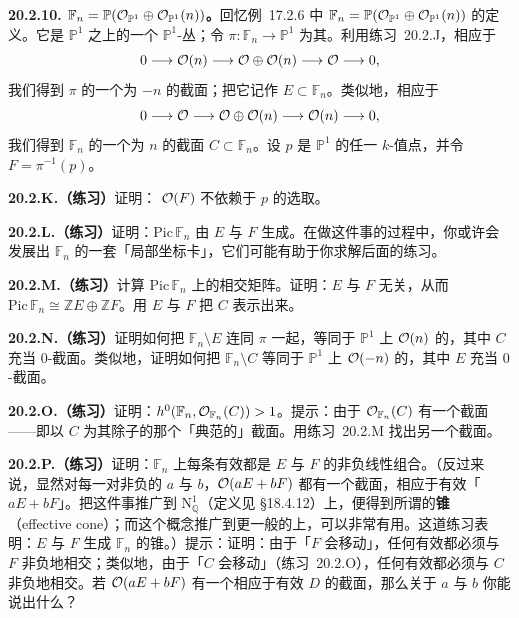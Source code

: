 \textbf{20.2.10. \trHirzebruchSurface{} $\mathbb{F}_n=\mathbb{P}(\mathcal{O}_{\mathbb{P}^1}\oplus\mathcal{O}_{\mathbb{P}^1}(n))$。}\quad 回忆\mbox{例~17.2.6} 中\trHirzebruchSurface{} $\mathbb{F}_n=\mathbb{P}(\mathcal{O}_{\mathbb{P}^1}\oplus\mathcal{O}_{\mathbb{P}^1}(n))$ 的定义。它是 $\mathbb{P}^1$ 之上的一个 $\mathbb{P}^1$-丛；令 $\pi\colon\mathbb{F}_n\to\mathbb{P}^1$ 为其\trStructureMorphism。利用\mbox{练习~20.2.J}，相应于
\[
0\longrightarrow\mathcal{O}(n)\longrightarrow\mathcal{O}\oplus\mathcal{O}(n)\longrightarrow\mathcal{O}\longrightarrow 0,
\]
我们得到 $\pi$ 的一个\trSelfIntersection{}为 $-n$ 的截面；把它记作 $E\subset\mathbb{F}_n$。类似地，相应于
\[
0\longrightarrow\mathcal{O}\longrightarrow\mathcal{O}\oplus\mathcal{O}(n)\longrightarrow\mathcal{O}(n)\longrightarrow 0,
\]
我们得到 $\mathbb{F}_n$ 的一个\trSelfIntersection{}为 $n$ 的截面 $C\subset\mathbb{F}_n$。设 $p$ 是 $\mathbb{P}^1$ 的任一 $k$-值点，并令 $F=\pi^{-1}(p)$。

\textbf{20.2.K.（练习）}\quad 证明：\trLineBundle{} $\mathcal{O}(F)$ 不依赖于 $p$ 的选取。

\textbf{20.2.L.（练习）}\quad 证明：$\mathrm{Pic}\,\mathbb{F}_n$ 由 $E$ 与 $F$ 生成。在做这件事的过程中，你或许会发展出 $\mathbb{F}_n$ 的一套「局部坐标卡」，它们可能有助于你求解后面的练习。

\textbf{20.2.M.（练习）}\quad 计算 $\mathrm{Pic}\,\mathbb{F}_n$ 上的相交矩阵。证明：$E$ 与 $F$ 无关，从而 $\mathrm{Pic}\,\mathbb{F}_n\cong\mathbb{Z}E\oplus\mathbb{Z}F$。用 $E$ 与 $F$ 把 $C$ 表示出来。

\textbf{20.2.N.（练习）}\quad 证明如何把 $\mathbb{F}_n\setminus E$ 连同\trStructureMorphism{} $\pi$ 一起，等同于 $\mathbb{P}^1$ 上\trLineBundle{} $\mathcal{O}(n)$ 的\trTotalSpace，其中 $C$ 充当 $0$-截面。类似地，证明如何把 $\mathbb{F}_n\setminus C$ 等同于 $\mathbb{P}^1$ 上\trLineBundle{} $\mathcal{O}(-n)$ 的\trTotalSpace，其中 $E$ 充当 $0$-截面。

\textbf{20.2.O.（练习）}\quad 证明：$h^0(\mathbb{F}_n,\mathcal{O}_{\mathbb{F}_n}(C))>1$。提示：由于 $\mathcal{O}_{\mathbb{F}_n}(C)$ 有一个截面——即以 $C$ 为其除子的那个「典范的」截面。用\mbox{练习~20.2.M} 找出另一个截面。

\textbf{20.2.P.（练习）}\quad 证明：$\mathbb{F}_n$ 上每条有效\trCurve{}都是 $E$ 与 $F$ 的非负线性组合。（反过来说，显然对每一对非负的 $a$ 与 $b$，$\mathcal{O}(aE+bF)$ 都有一个截面，相应于有效\trCurve{}「$aE+bF$」。把这件事推广到 $\mathrm{N}^1_{\mathbb{Q}}$（定义见 \S18.4.12）上，便得到所谓的\textbf{\trEffective{}锥}（effective cone）；而这个概念推广到更一般的\trProper\trVariety{}上，可以非常有用。这道练习表明：$E$ 与 $F$ 生成 $\mathbb{F}_n$ 的\trEffective{}锥。）提示：证明：由于「$F$ 会移动」，任何有效\trCurve{}都必须与 $F$ 非负地相交；类似地，由于「$C$ 会移动」（\mbox{练习~20.2.O}），任何有效\trCurve{}都必须与 $C$ 非负地相交。若 $\mathcal{O}(aE+bF)$ 有一个相应于有效\trCurve{} $D$ 的截面，那么关于 $a$ 与 $b$ 你能说出什么？

